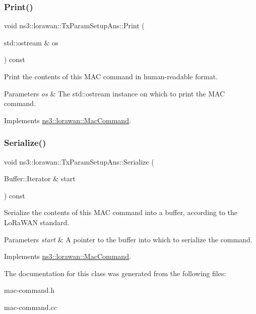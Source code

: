 \subsubsection{\texorpdfstring{Print()}{Print()}}
{\footnotesize\ttfamily void ns3\+::lorawan\+::\+Tx\+Param\+Setup\+Ans\+::\+Print (\begin{DoxyParamCaption}\item[{std\+::ostream \&}]{os }\end{DoxyParamCaption}) const\hspace{0.3cm}{\ttfamily [virtual]}}

Print the contents of this M\+AC command in human-\/readable format.


\begin{DoxyParams}{Parameters}
{\em os} & The std\+::ostream instance on which to print the M\+AC command. \\
\hline
\end{DoxyParams}


Implements \hyperlink{classns3_1_1lorawan_1_1MacCommand_a6bf88db38dab7dcd817811a9fb59f920}{ns3\+::lorawan\+::\+Mac\+Command}.

\mbox{\label{classns3_1_1lorawan_1_1TxParamSetupAns_a274b762e74e9a5b39d0fc50819d81b3f}} 
\subsubsection{\texorpdfstring{Serialize()}{Serialize()}}
{\footnotesize\ttfamily void ns3\+::lorawan\+::\+Tx\+Param\+Setup\+Ans\+::\+Serialize (\begin{DoxyParamCaption}\item[{Buffer\+::\+Iterator \&}]{start }\end{DoxyParamCaption}) const\hspace{0.3cm}{\ttfamily [virtual]}}

Serialize the contents of this M\+AC command into a buffer, according to the Lo\+Ra\+W\+AN standard.


\begin{DoxyParams}{Parameters}
{\em start} & A pointer to the buffer into which to serialize the command. \\
\hline
\end{DoxyParams}


Implements \hyperlink{classns3_1_1lorawan_1_1MacCommand_a0ed44b33942ddc3dc9694dc06ab0b87f}{ns3\+::lorawan\+::\+Mac\+Command}.



The documentation for this class was generated from the following files\+:\begin{DoxyCompactItemize}
\item 
mac-\/command.\+h\item 
mac-\/command.\+cc\end{DoxyCompactItemize}
